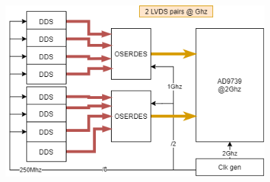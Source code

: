 \documentclass[11pt]{article}
\begin{document}
\begin{preview}
\begin{enumerate}
    \begin{center}
        \includegraphics[width=0.75\textwidth]{res/afsdffg.png}
    \end{center}
    

\end{enumerate}

\end{preview}
\end{document}
